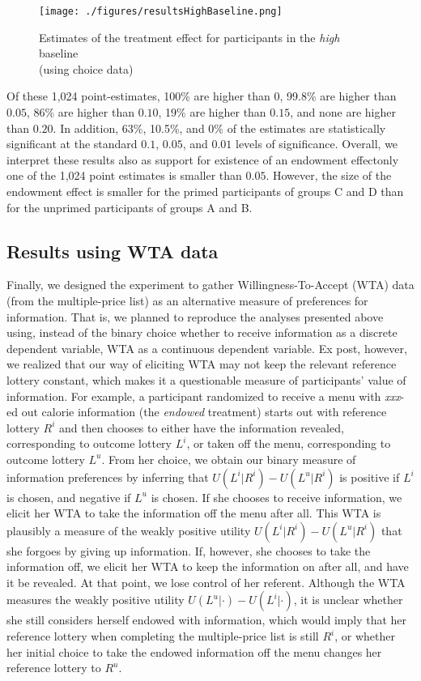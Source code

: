 \begin{figure}[ht]
  \caption{Estimates of the treatment effect for participants in the \emph{high} baseline \\ (using choice data)}\label{fig:resultsHighBaseline}
  \begin{center}
  {\texttt{[image: ./figures/resultsHighBaseline.png]}}
  \end{center}
\end{figure}

Of these 1,024 point-estimates, 100\% are higher than $0$, 99.8\% are higher than $0.05$, 86\% are higher than $0.10$, 19\% are higher than $0.15$, and none are higher than $0.20$. In addition, 63\%, 10.5\%, and 0\% of the estimates are statistically significant at the standard $0.1$, $0.05$, and $0.01$ levels of significance. Overall, we interpret these results also as support for existence of an endowment effect\textemdash only one of the 1,024 point estimates is smaller than $0.05$. However, the size of the endowment effect is smaller for the primed participants of groups C and D than for the unprimed participants of groups A and B.

\subsection{Results using WTA data}

Finally, we designed the experiment to gather Willingness-To-Accept (WTA) data (from the multiple-price list) as an alternative measure of preferences for information. That is, we planned to reproduce the analyses presented above using, instead of the binary choice whether to receive information as a discrete dependent variable, WTA as a continuous dependent variable. Ex post, however, we realized that our way of eliciting WTA may not keep the relevant reference lottery constant, which makes it a questionable measure of participants’ value of information. For example, a participant randomized to receive a menu with \emph{xxx}-ed out calorie information (the \emph{endowed} treatment) starts out with reference lottery $R^i$ and then chooses to either have the information revealed, corresponding to outcome lottery $L^i$, or taken off the menu, corresponding to outcome lottery $L^u$. From her choice, we obtain our binary measure of information preferences by inferring that $U(L^i|R^i)-U(L^u|R^i)$ is positive if $L^i$ is chosen, and negative if $L^u$ is chosen. If she chooses to receive information, we elicit her WTA to take the information off the menu after all. This WTA is plausibly a measure of the weakly positive utility $U(L^i|R^i)-U(L^u|R^i)$ that she forgoes by giving up information. If, however, she chooses to take the information off, we elicit her WTA to keep the information on after all, and have it be revealed. At that point, we lose control of her referent. Although the WTA measures the weakly positive utility $U(L^u|\cdot)-U(L^i|\cdot)$, it is unclear whether she still considers herself endowed with information, which would imply that her reference lottery when completing the multiple-price list is still $R^i$, or whether her initial choice to take the endowed information off the menu changes her reference lottery to $R^u$.

